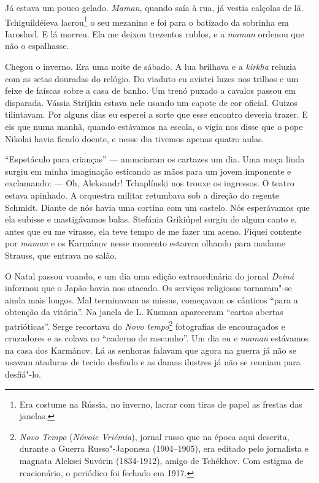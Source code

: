 Já estava um pouco gelado. \emph{Maman}, quando saía à rua, já vestia
calçolas de lã. Tchiguildéieva lacrou\footnote{Era costume na Rússia, no
  inverno, lacrar com tiras de papel as frestas das janelas.} o seu
mezanino e foi para o batizado da sobrinha em Iaroslavl. E lá morreu.
Ela me deixou trezentos rublos, e a \emph{maman} ordenou que não o
espalhasse.

Chegou o inverno. Era uma noite de sábado. A lua brilhava e a
\emph{kirkha} reluzia com as setas douradas do relógio. Do viaduto eu
avistei luzes nos trilhos e um feixe de faíscas sobre a casa de banho.
Um trenó puxado a cavalos passou em disparada. Vássia Stríjkin estava
nele usando um capote de cor oficial. Guizos tilintavam. Por alguns dias
eu esperei a sorte que esse encontro deveria trazer. E eis que numa
manhã, quando estávamos na escola, o vigia nos disse que o pope Nikolai
havia ficado doente, e nesse dia tivemos apenas quatro aulas.

``Espetáculo para crianças'' --- anunciaram os cartazes um dia. Uma moça
linda surgiu em minha imaginação esticando as mãos para um jovem
imponente e exclamando: --- Oh, Aleksandr! Tchaplínski nos trouxe os
ingressos. O teatro estava apinhado. A orquestra militar retumbava sob a
direção do regente Schmidt. Diante de nós havia uma cortina com um
castelo. Nós esperávamos que ela subisse e mastigávamos balas. Stefánia
Grikiúpel surgiu de algum canto e, antes que eu me virasse, ela teve
tempo de me fazer um aceno. Fiquei contente por \emph{maman} e os
Karmánov nesse momento estarem olhando para madame Strauss, que entrava
no salão.

O Natal passou voando, e um dia uma edição extraordinária do jornal
\emph{Dviná} informou que o Japão havia nos atacado. Os serviços
religiosos tornaram"-se ainda mais longos. Mal terminavam as missas,
começavam os cânticos ``para a obtenção da vitória''. Na janela de L.
Kusman apareceram ``cartas abertas patrióticas''. Serge recortava do
\emph{Novo} \emph{tempo}\footnote{\emph{Novo Tempo} (\emph{Nóvoie
  Vriémia}), jornal russo que na época aqui descrita, durante a Guerra
  Russo"-Japonesa (1904--1905), era editado pelo jornalista e magnata
  Aleksei Suvórin (1834-1912), amigo de Tchékhov. Com estigma de
  reacionário, o periódico foi fechado em 1917.} fotografias de
encouraçados e cruzadores e as colava no ``caderno de rascunho''. Um dia
eu e \emph{maman} estávamos na casa dos Karmánov. Lá as senhoras falavam
que agora na guerra já não se usavam ataduras de tecido desfiado e as
damas ilustres já não se reuniam para desfiá"-lo.

